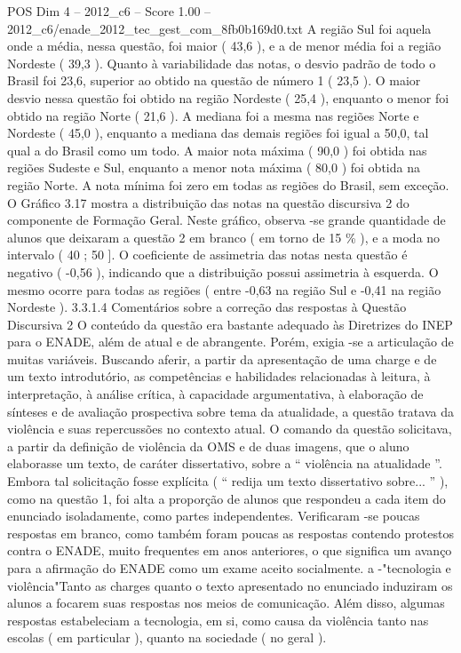 \begin{textsample}{POS Dim 4 – 2012\_c6 – Score 1.00 – 2012\_c6/enade\_2012\_tec\_gest\_com\_8fb0b169d0.txt}
A região Sul foi aquela onde a média, nessa questão, foi maior ( 43,6 ), e a de menor média foi a região Nordeste ( 39,3 ).
Quanto à variabilidade das notas, o desvio padrão de todo o Brasil foi 23,6, superior ao obtido na questão de número 1 ( 23,5 ).
O maior desvio nessa questão foi obtido na região Nordeste ( 25,4 ), enquanto o menor foi obtido na região Norte ( 21,6 ).
A mediana foi a mesma nas regiões Norte e Nordeste ( 45,0 ), enquanto a mediana das demais regiões foi igual a 50,0, tal qual a do Brasil como um todo.
A maior nota máxima ( 90,0 ) foi obtida nas regiões Sudeste e Sul, enquanto a menor nota máxima ( 80,0 ) foi obtida na região Norte.
A nota mínima foi zero em todas as regiões do Brasil, sem exceção.
O Gráfico 3.17 mostra a distribuição das notas na questão discursiva 2 do componente de Formação Geral.
Neste gráfico, observa -se grande quantidade de alunos que deixaram a questão 2 em branco ( em torno de 15 \% ), e a moda no intervalo ( 40 ; 50 ].
O coeficiente de assimetria das notas nesta questão é negativo ( -0,56 ), indicando que a distribuição possui assimetria à esquerda.
O mesmo ocorre para todas as regiões ( entre -0,63 na região Sul e -0,41 na região Nordeste ). 3.3.1.4 Comentários sobre a correção das respostas à Questão Discursiva 2 O conteúdo da questão era bastante adequado às Diretrizes do INEP para o ENADE, além de atual e de abrangente.
Porém, exigia -se a articulação de muitas variáveis.
Buscando aferir, a partir da apresentação de uma charge e de um texto introdutório, as competências e habilidades relacionadas à leitura, à interpretação, à análise crítica, à capacidade argumentativa, à elaboração de sínteses e de avaliação prospectiva sobre tema da atualidade, a questão tratava da violência e suas repercussões no contexto atual.
O comando da questão solicitava, a partir da definição de violência da OMS e de duas imagens, que o aluno elaborasse um texto, de caráter dissertativo, sobre a “ violência na atualidade ”.
Embora tal solicitação fosse explícita ( “ redija um texto dissertativo sobre... ” ), como na questão 1, foi alta a proporção de alunos que respondeu a cada item do enunciado isoladamente, como partes independentes.
Verificaram -se poucas respostas em branco, como também foram poucas as respostas contendo protestos contra o ENADE, muito frequentes em anos anteriores, o que significa um avanço para a afirmação do ENADE como um exame aceito socialmente. a -"tecnologia e violência"Tanto as charges quanto o texto apresentado no enunciado induziram os alunos a focarem suas respostas nos meios de comunicação.
Além disso, algumas respostas estabeleciam a tecnologia, em si, como causa da violência tanto nas escolas ( em particular ), quanto na sociedade ( no geral ).

\end{textsample}
